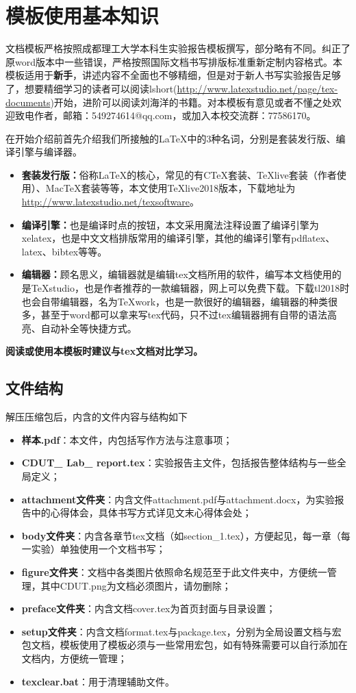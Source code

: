 \chapter{模板使用基本知识}
文档模板严格按照成都理工大学本科生实验报告模板撰写，部分略有不同。纠正了原word版本中一些错误，严格按照国际文档书写排版标准重新定制内容格式。本模板适用于\textbf{新手}，讲述内容不全面也不够精细，但是对于新人书写实验报告足够了，想要精细学习的读者可以阅读lshort(\url{http://www.latexstudio.net/page/tex-documents})开始，进阶可以阅读刘海洋的书籍。对本模板有意见或者不懂之处欢迎致电作者，邮箱：549274614@qq.com，或加入本校交流群：77586170。

在开始介绍前首先介绍我们所接触的\LaTeX 中的3种名词，分别是套装发行版、编译引擎与编译器。
\begin{itemize}
\item \textbf{套装发行版：}俗称\LaTeX 的核心，常见的有CTeX套装、TeXlive套装（作者使用）、MacTeX套装等等，本文使用TeXlive2018版本，下载地址为\url{http://www.latexstudio.net/texsoftware}。

\item \textbf{编译引擎：}也是编译时点的按钮，本文采用魔法注释设置了编译引擎为xelatex，也是中文文档排版常用的编译引擎，其他的编译引擎有pdflatex、latex、bibtex等等。
 
\item \textbf{编辑器：}顾名思义，编辑器就是编辑tex文档所用的软件，编写本文档使用的是TeXstudio，也是作者推荐的一款编辑器，网上可以免费下载。下载tl2018时也会自带编辑器，名为TeXwork，也是一款很好的编辑器，编辑器的种类很多，甚至于word都可以拿来写tex代码，只不过tex编辑器拥有自带的语法高亮、自动补全等快捷方式。
\end{itemize}

\textbf{阅读或使用本模板时建议与tex文档对比学习。}

\section{文件结构}
解压压缩包后，内含的文件内容与结构如下
\begin{itemize}
\item \textbf{样本.pdf}：本文件，内包括写作方法与注意事项；
\item \textbf{CDUT\_ Lab\_ report.tex}：实验报告主文件，包括报告整体结构与一些全局定义；
\item \textbf{attachment文件夹}：内含文件attachment.pdf与attachment.docx，为实验报告中的心得体会，具体书写方式详见文末心得体会处；
\item \textbf{body文件夹}：内含各章节tex文档（如section\_1.tex），方便起见，每一章（每一实验）单独使用一个文档书写；
\item \textbf{figure文件夹}：文档中各类图片依照命名规范至于此文件夹中，方便统一管理，其中CDUT.png为文档必须图片，请勿删除；
\item \textbf{preface文件夹}：内含文档cover.tex为首页封面与目录设置；
\item \textbf{setup文件夹}：内含文档format.tex与package.tex，分别为全局设置文档与宏包文档，模板使用了模板必须与一些常用宏包，如有特殊需要可以自行添加在文档内，方便统一管理；
\item \textbf{texclear.bat}：用于清理辅助文件。
\end{itemize}

